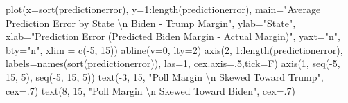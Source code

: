 \documentclass[
  letterpaper,
  DIV=11,
  numbers=noendperiod]{scrreprt}
\newenvironment{Shaded}{\begin{snugshade}}{\end{snugshade}}
\newcommand{\AttributeTok}[1]{\textcolor[rgb]{0.40,0.45,0.13}{#1}}
\newcommand{\DecValTok}[1]{\textcolor[rgb]{0.68,0.00,0.00}{#1}}
\newcommand{\FunctionTok}[1]{\textcolor[rgb]{0.28,0.35,0.67}{#1}}
\newcommand{\NormalTok}[1]{\textcolor[rgb]{0.00,0.23,0.31}{#1}}
\newcommand{\SpecialCharTok}[1]{\textcolor[rgb]{0.37,0.37,0.37}{#1}}
\newcommand{\StringTok}[1]{\textcolor[rgb]{0.13,0.47,0.30}{#1}}
\begin{document}
\begin{Shaded}
\begin{Highlighting}[]
\FunctionTok{plot}\NormalTok{(}\AttributeTok{x=}\FunctionTok{sort}\NormalTok{(predictionerror), }\AttributeTok{y=}\DecValTok{1}\SpecialCharTok{:}\FunctionTok{length}\NormalTok{(predictionerror),}
     \AttributeTok{main=}\StringTok{"Average Prediction Error by State }\SpecialCharTok{\textbackslash{}n}\StringTok{ Biden {-} Trump Margin"}\NormalTok{,}
     \AttributeTok{ylab=}\StringTok{"State"}\NormalTok{,}
     \AttributeTok{xlab=}\StringTok{"Prediction Error (Predicted Biden Margin {-} Actual Margin)"}\NormalTok{,}
     \AttributeTok{yaxt=}\StringTok{"n"}\NormalTok{,}
     \AttributeTok{bty=}\StringTok{"n"}\NormalTok{,}
     \AttributeTok{xlim =} \FunctionTok{c}\NormalTok{(}\SpecialCharTok{{-}}\DecValTok{5}\NormalTok{, }\DecValTok{15}\NormalTok{)) }
\FunctionTok{abline}\NormalTok{(}\AttributeTok{v=}\DecValTok{0}\NormalTok{, }\AttributeTok{lty=}\DecValTok{2}\NormalTok{)}
\FunctionTok{axis}\NormalTok{(}\DecValTok{2}\NormalTok{, }\DecValTok{1}\SpecialCharTok{:}\FunctionTok{length}\NormalTok{(predictionerror), }\AttributeTok{labels=}\FunctionTok{names}\NormalTok{(}\FunctionTok{sort}\NormalTok{(predictionerror)), }\AttributeTok{las=}\DecValTok{1}\NormalTok{, }
     \AttributeTok{cex.axis=}\NormalTok{.}\DecValTok{5}\NormalTok{,}\AttributeTok{tick=}\NormalTok{F)}
\FunctionTok{axis}\NormalTok{(}\DecValTok{1}\NormalTok{, }\FunctionTok{seq}\NormalTok{(}\SpecialCharTok{{-}}\DecValTok{5}\NormalTok{, }\DecValTok{15}\NormalTok{, }\DecValTok{5}\NormalTok{), }\FunctionTok{seq}\NormalTok{(}\SpecialCharTok{{-}}\DecValTok{5}\NormalTok{, }\DecValTok{15}\NormalTok{, }\DecValTok{5}\NormalTok{))}
\FunctionTok{text}\NormalTok{(}\SpecialCharTok{{-}}\DecValTok{3}\NormalTok{, }\DecValTok{15}\NormalTok{, }\StringTok{"Poll Margin }\SpecialCharTok{\textbackslash{}n}\StringTok{ Skewed Toward Trump"}\NormalTok{, }\AttributeTok{cex=}\NormalTok{.}\DecValTok{7}\NormalTok{)}
\FunctionTok{text}\NormalTok{(}\DecValTok{8}\NormalTok{, }\DecValTok{15}\NormalTok{, }\StringTok{"Poll Margin }\SpecialCharTok{\textbackslash{}n}\StringTok{ Skewed Toward Biden"}\NormalTok{, }\AttributeTok{cex=}\NormalTok{.}\DecValTok{7}\NormalTok{)}
\end{Highlighting}
\end{Shaded}
\end{document}
